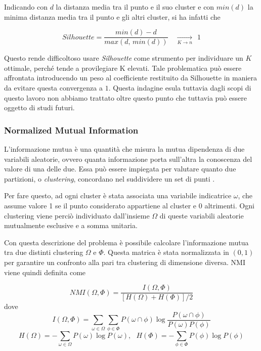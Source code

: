 \documentclass[
	11pt, %
	a4paper, %
	oneside, %
	headinclude,footinclude, %
	BCOR5mm, %
]{scrartcl}
\begin{document}
			Indicando con $d$ la distanza media tra il punto e il suo cluster e con $min(d)$ la minima distanza media tra il punto e gli altri cluster, si ha infatti che

			\begin{equation} \label{eq:silhouetteToOne}
				Silhouette = \frac{min(d) - d}{ max(d, \,min(d)) } \quad \xrightarrow [K \to n] \quad ~~ 1 \end{equation}

			Questo rende difficoltoso usare \emph{Silhouette} come strumento per individuare un $K$ ottimale, perché tende a provilegiare K elevati.
			Tale problematica può essere affrontata introducendo un peso al coefficiente restituito da Silhouette in maniera da evitare questa convergenza a $1$.
			Questa indagine esula tuttavia dagli scopi di questo lavoro non abbiamo trattato oltre questo punto che tuttavia può essere oggetto di studi futuri.

		\subsubsection{Normalized Mutual Information} \label{sec:NMI}
			L'informazione mutua è una quantità che misura la mutua dipendenza di due variabili aleatorie, ovvero quanta informazione porta sull'altra la conoscenza del valore di una delle due. 
			Essa può essere impiegata per valutare quanto due partizioni, o \emph{clustering}, concordano nel suddividere un set di punti \cite{Manning}.

			Per fare questo, ad ogni cluster è stata associata una variabile indicatrice $\omega$, che assume valore 1 se il punto considerato appartiene al cluster e 0 altrimenti.
			Ogni clustering viene perciò individuato dall'insieme $\Omega$ di queste variabili aleatorie mutualmente esclusive e a somma unitaria.

			Con questa descrizione del problema è possibile calcolare l'informazione mutua tra due distinti clustering $\Omega$ e $\Phi$.
			Questa matrica è stata normalizzata in $(0, 1)$ per garantire un confronto alla pari tra clustering di dimensione diversa.
			NMI viene quindi definita come
			
			\begin{equation} \label{eq:NMI}
				NMI(\Omega, \Phi) = \frac
					{I(\Omega, \Phi)}
					{\left[ H(\Omega) + H(\Phi)\right] / 2}
			\end{equation}
			dove
			$$ I(\Omega, \Phi) =
					\sum_{\omega \in \Omega} \sum_{\phi \in \Phi}
						P(\omega \cap \phi) \log \frac {P(\omega \cap \phi)} {P(\omega) P(\phi)} $$
			$$ H(\Omega) = - \sum_{\omega \in \Omega} P(\omega) \log P(\omega), ~~~ H(\Phi) = - \sum_{\phi \in \Phi} P(\phi) \log P(\phi) $$
\end{document}
